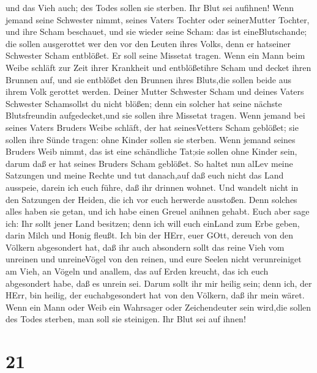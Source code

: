 und das Vieh auch; des Todes sollen sie sterben. Ihr Blut sei aufihnen!
 Wenn jemand seine Schwester nimmt, seines Vaters Tochter
oder seinerMutter Tochter, und ihre Scham beschauet, und sie wieder
seine Scham: das ist eineBlutschande; die sollen ausgerottet wer den vor
den Leuten ihres Volks, denn er hatseiner Schwester Scham entblößet. Er
soll seine Missetat tragen.  Wenn ein Mann beim Weibe
schläft zur Zeit ihrer Krankheit und entblößetihre Scham und decket
ihren Brunnen auf, und sie entblößet den Brunnen ihres Bluts,die sollen
beide aus ihrem Volk gerottet werden.  Deiner Mutter
Schwester Scham und deines Vaters Schwester Schamsollst du nicht blößen;
denn ein solcher hat seine nächste Blutsfreundin aufgedecket,und sie
sollen ihre Missetat tragen.  Wenn jemand bei seines Vaters
Bruders Weibe schläft, der hat seinesVetters Scham geblößet; sie sollen
ihre Sünde tragen: ohne Kinder sollen sie sterben.  Wenn
jemand seines Bruders Weib nimmt, das ist eine schändliche Tat;sie
sollen ohne Kinder sein, darum daß er hat seines Bruders Scham geblößet.
 So haltet nun alLev meine Satzungen und meine Rechte und
tut danach,auf daß euch nicht das Land ausspeie, darein ich euch führe,
daß ihr drinnen wohnet.  Und wandelt nicht in den Satzungen
der Heiden, die ich vor euch herwerde ausstoßen. Denn solches alles
haben sie getan, und ich habe einen Greuel anihnen gehabt. 
Euch aber sage ich: Ihr sollt jener Land besitzen; denn ich will euch
einLand zum Erbe geben, darin Milch und Honig fleußt. Ich bin der HErr,
euer GOtt, dereuch von den Völkern abgesondert hat,  daß
ihr auch absondern sollt das reine Vieh vom unreinen und unreineVögel
von den reinen, und eure Seelen nicht verunreiniget am Vieh, an Vögeln
und anallem, das auf Erden kreucht, das ich euch abgesondert habe, daß
es unrein sei.  Darum sollt ihr mir heilig sein; denn ich,
der HErr, bin heilig, der euchabgesondert hat von den Völkern, daß ihr
mein wäret.  Wenn ein Mann oder Weib ein Wahrsager oder
Zeichendeuter sein wird,die sollen des Todes sterben, man soll sie
steinigen. Ihr Blut sei auf ihnen!

\hypertarget{section-20}{%
\section{21}\label{section-20}}

